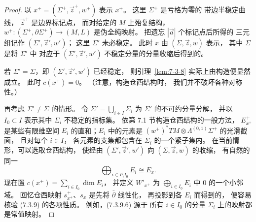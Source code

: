 \begin{proof}
以
$x^+=(\Sigma^+,\vec z^+,w^+)$
表示 $x^+$。
这里 $\Sigma^+$ 是亏格为零的
带边半稳定曲线，
$\vec z^+$ 是边界标记点，
而对给定的 $M$ 上殆复结构，
$w^+\colon(\Sigma^+,\partial\Sigma^+)
\to(M,L)$ 是伪全纯映射。
把遗忘 $|\vec a|$ 个标记点后所得的
三元组记作 $(\Sigma',\vec z',w')$；
这里 $\Sigma'$ 未必稳定。
此时 $x$ 由 $(\Sigma,\vec z,w)$ 表示，
其中 $\Sigma$ 是将 $\Sigma'$ 中
对应于 $(\Sigma',\vec z',w')$
不稳定分量的分量收缩后得到的。

若 $\Sigma'=\Sigma$，即
$(\Sigma',\vec z',w')$ 已经稳定，
则引理~\ref{lem:7-3-8}
实际上由构造便显然成立。
此时 $c(x^+)=0$。
（注意，构造仓西结构时，
我们并不破坏各种对称性。）

再考虑 $\Sigma'\ne\Sigma$ 的情形。
令 $\Sigma'=\bigcup_{i\in I}\Sigma_i$
为 $\Sigma'$ 的不可约分量分解，
并以 $I_0\subset I$ 表示其中
$\Sigma_i$ 不稳定的指标集。
依第 7.1 节构造仓西结构的一般方法，
$E_{x^+}^+$ 是某些有限维空间 $E_i$
的直和；$E_i$ 中的元素是
$(w^+)^*TM\otimes\Lambda^{(0,1)}\Sigma^+$
的光滑截面，
且对每个 $i\in I$，
各元素的支集都包含在
$\Sigma_i$ 的一个紧子集内。
在当前情形，可以选取仓西结构，
使经由
$(\Sigma',\vec z',w')$
向 $(\Sigma,\vec z,w)$ 的收缩，
有自然的同一
\[
\bigoplus_{i\in I\setminus I_0}E_i\cong E_x.
\]
现在置
$c(x^+)=\sum_{i\in I_0}\dim E_i$，
并定义 $W'_{x^+}$ 为
$\bigoplus_{i\in I_0}E_i$
中 $0$ 的一个小邻域。
回忆仓西映射 $s_{x^+}^+$、$s_x$
是先将 $\bar\partial$ 线性化，
再投影到各 $E_i$ 而得到的，
便容易核验 (7.3.9) 的各项性质。
例如，(7.3.9.6) 源于
所有 $i\in I_0$ 的分量 $\Sigma_i$
上的映射都是常值映射。
\end{proof}
